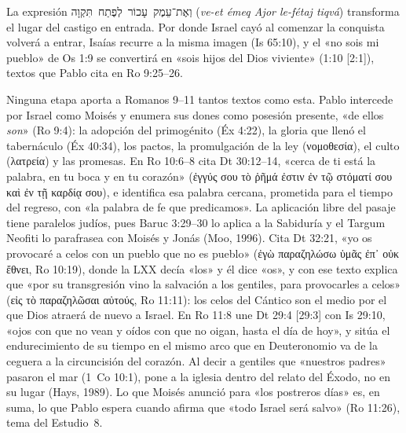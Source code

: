 \documentclass[11pt,letterpaper]{article}
\newcommand{\heb}[1]{\mbox{\foreignlanguage{hebrew}{#1}}}
\newcommand{\grc}[1]{\foreignlanguage{ancientgreek}{#1}}
\begin{document}
La expresión \heb{וְאֶת־עֵמֶק עָכוֹר לְפֶתַח תִּקְוָה} (\emph{ve-et émeq Ajor le-fétaj tiqvá}) transforma el lugar del castigo en entrada. Por donde Israel cayó al comenzar la conquista volverá a entrar, Isaías recurre a la misma imagen (Is 65:10), y el «no sois mi pueblo» de Os 1:9 se convertirá en «sois hijos del Dios viviente» (1:10 [2:1]), textos que Pablo cita en Ro 9:25–26.

Ninguna etapa aporta a Romanos 9–11 tantos textos como esta. Pablo intercede por Israel como Moisés y enumera sus dones como posesión presente, «de ellos \emph{son}» (Ro 9:4): la adopción del primogénito (Éx 4:22), la gloria que llenó el tabernáculo (Éx 40:34), los pactos, la promulgación de la ley (\grc{νομοθεσία}), el culto (\grc{λατρεία}) y las promesas. En Ro 10:6–8 cita Dt 30:12–14, «cerca de ti está la palabra, en tu boca y en tu corazón» (\grc{ἐγγύς σου τὸ ῥῆμά ἐστιν ἐν τῷ στόματί σου καὶ ἐν τῇ καρδίᾳ σου}), e identifica esa palabra cercana, prometida para el tiempo del regreso, con «la palabra de fe que predicamos». La aplicación libre del pasaje tiene paralelos judíos, pues Baruc 3:29–30 lo aplica a la Sabiduría y el Targum Neofiti lo parafrasea con Moisés y Jonás (Moo, 1996). Cita Dt 32:21, «yo os provocaré a celos con un pueblo que no es pueblo» (\grc{ἐγὼ παραζηλώσω ὑμᾶς ἐπ᾽ οὐκ ἔθνει}, Ro 10:19), donde la LXX decía «los» y él dice «os», y con ese texto explica que «por su transgresión vino la salvación a los gentiles, para provocarles a celos» (\grc{εἰς τὸ παραζηλῶσαι αὐτούς}, Ro 11:11): los celos del Cántico son el medio por el que Dios atraerá de nuevo a Israel. En Ro 11:8 une Dt 29:4 [29:3] con Is 29:10, «ojos con que no vean y oídos con que no oigan, hasta el día de hoy», y sitúa el endurecimiento de su tiempo en el mismo arco que en Deuteronomio va de la ceguera a la circuncisión del corazón. Al decir a gentiles que «nuestros padres» pasaron el mar (1~Co 10:1), pone a la iglesia dentro del relato del Éxodo, no en su lugar (Hays, 1989). Lo que Moisés anunció para «los postreros días» es, en suma, lo que Pablo espera cuando afirma que «todo Israel será salvo» (Ro 11:26), tema del Estudio~8.
\end{document}
